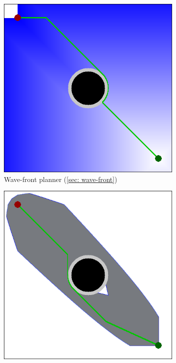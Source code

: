 \begin{figure}[h]
  \centering
  \begin{subfigure}[b]{0.2\linewidth}
    \includegraphics[width=\linewidth]{images/screenshot_43.png}
     \caption{Wave-front planner (\ref{sec: wave-front})}
  \end{subfigure}
  \hfill
  \begin{subfigure}[b]{0.2\linewidth}
    \includegraphics[width=\linewidth]{images/screenshot_44.png}

\end{subfigure}
\end{figure}
